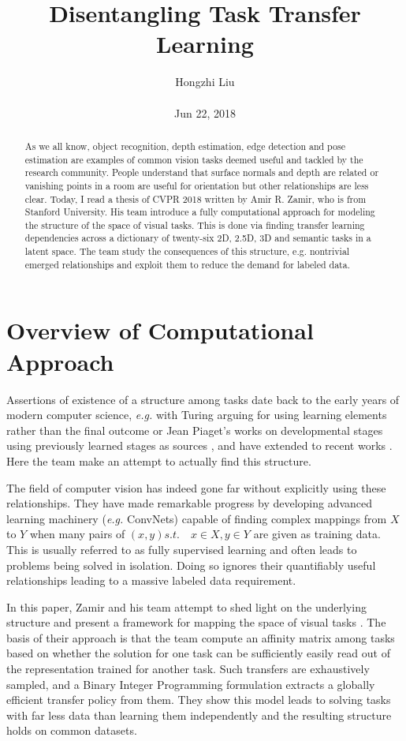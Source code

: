 \documentclass[10pt,twocolumn,letterpaper]{article}
\title{Disentangling Task Transfer Learning}
\author{Hongzhi Liu\\\\
Jun 22, 2018}
\begin{document}
\maketitle
\begin{abstract}
	As we all know, object recognition, depth estimation, edge detection and pose estimation are examples of common vision tasks deemed useful and tackled by the research community. People understand that surface normals and depth are related or vanishing points in a room are useful for orientation but other relationships are less clear. Today, I read a thesis of CVPR 2018 written by Amir R. Zamir, who is from Stanford University. His team introduce a fully computational approach for modeling the structure of the space of visual tasks. This is done via finding transfer learning dependencies across a dictionary of twenty-six 2D, 2.5D, 3D and semantic tasks in a latent space. The team study the consequences of this structure, e.g. nontrivial emerged relationships and exploit them to reduce the demand for labeled data.
\end{abstract}
\section{Overview of Computational Approach}

Assertions of existence of a structure among tasks date back to the early years of modern computer science, \emph{e.g.} with Turing arguing for using learning elements \cite{turing2009computing} rather than the final outcome or Jean Piaget’s works on developmental stages using previously learned stages as sources \cite{gopnik2004theory}, and have extended to recent works \cite{richter2017playing,doersch2017multi,wang2017transitive}. Here the team make an attempt to actually find this structure.

The field of computer vision has indeed gone far without explicitly using these relationships. They have made remarkable progress by developing advanced learning machinery (\emph{e.g.} ConvNets) capable of finding complex mappings from $X$ to $Y$ when many pairs of $(x,y) s.t.\quad x\in X,y\in Y$ are given as training data. This is usually referred to as fully supervised learning and often leads to problems being solved in isolation. Doing so ignores their quantifiably useful relationships leading to a massive labeled data requirement.

In this paper, Zamir and his team attempt to shed light on the underlying structure and present a framework for mapping the space of visual tasks \cite{Achanta2009Frequency}. The basis of their approach is that the team compute an affinity matrix among tasks based on whether the solution for one task can be sufficiently easily read out of the representation trained for another task. Such transfers are exhaustively sampled, and a Binary Integer Programming formulation extracts a globally efficient transfer policy from them. They show this model leads to solving tasks with far less data than learning them independently and the resulting structure holds on common datasets.
\end{document}
